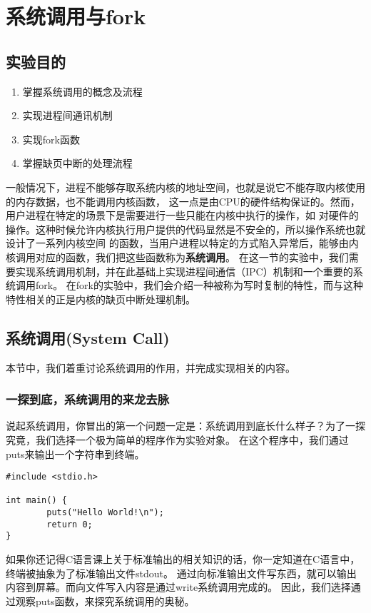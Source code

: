 \chapter{系统调用与fork}

\section{实验目的}
  \begin{enumerate}
    \item 掌握系统调用的概念及流程
    \item 实现进程间通讯机制
    \item 实现fork函数
    \item 掌握缺页中断的处理流程
  \end{enumerate}

一般情况下，进程不能够存取系统内核的地址空间，也就是说它不能存取内核使用的内存数据，也不能调用内核函数，
这一点是由CPU的硬件结构保证的。然而，用户进程在特定的场景下是需要进行一些只能在内核中执行的操作，如
对硬件的操作。这种时候允许内核执行用户提供的代码显然是不安全的，所以操作系统也就设计了一系列内核空间
的函数，当用户进程以特定的方式陷入异常后，能够由内核调用对应的函数，我们把这些函数称为\textbf{系统调用}。
在这一节的实验中，我们需要实现系统调用机制，并在此基础上实现进程间通信（IPC）机制和一个重要的系统调用fork。
在fork的实验中，我们会介绍一种被称为写时复制的特性，而与这种特性相关的正是内核的缺页中断处理机制。

\section{系统调用(System Call)}
本节中，我们着重讨论系统调用的作用，并完成实现相关的内容。

\subsection{一探到底，系统调用的来龙去脉}
说起系统调用，你冒出的第一个问题一定是：系统调用到底长什么样子？为了一探究竟，我们选择一个极为简单的程序作为实验对象。
在这个程序中，我们通过puts来输出一个字符串到终端。

\begin{verbatim}
#include <stdio.h>

int main() {
        puts("Hello World!\n");
        return 0;
}
\end{verbatim}

\begin{note}
如果你还记得C语言课上关于标准输出的相关知识的话，你一定知道在C语言中，终端被抽象为了标准输出文件stdout。
通过向标准输出文件写东西，就可以输出内容到屏幕。而向文件写入内容是通过write系统调用完成的。
因此，我们选择通过观察puts函数，来探究系统调用的奥秘。
\end{note}

